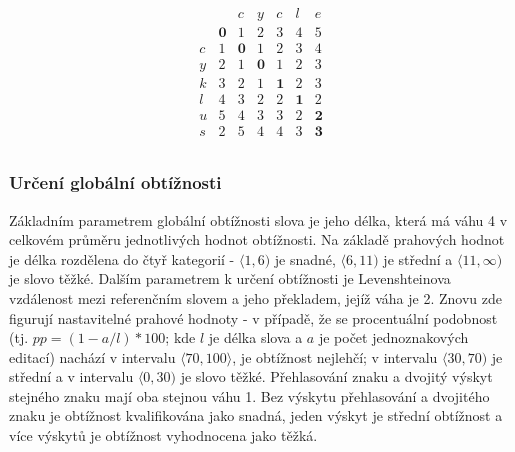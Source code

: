 \documentclass[a4paper,11pt,titlepage,fleqn]{article}
\begin{document}
            \begin{ceqn}
            \begin{align}
                \label{leven-matice}
                \begin{matrix}
                    &  & c & y & c & l & e \\
                    & \textbf{0} & 1 & 2  & 3 & 4  & 5 \\
                    c & 1 & \textbf{0} & 1 & 2 & 3 & 4 \\
                    y & 2 & 1 & \textbf{0} & 1 & 2 & 3 \\
                    k & 3 & 2 & 1 & \textbf{1} & 2 & 3 \\
                    l & 4 & 3 & 2 & 2 & \textbf{1} & 2 \\
                    u & 5 & 4 & 3 & 3 & 2 & \textbf{2} \\
                    s & 2 & 5 & 4 & 4 & 3 & \textbf{3} \\ 
                \end{matrix}
            \end{align}
            \end{ceqn}

        \subsubsection{Určení globální obtížnosti}
            Základním parametrem globální obtížnosti slova je jeho délka, která má váhu 4 v celkovém průměru jednotlivých hodnot obtížnosti. Na základě prahových hodnot je délka rozdělena do čtyř kategorií - $\langle1,6)$ je snadné, $\langle6,11)$ je střední a $\langle11,\infty)$ je slovo těžké. Dalším parametrem k určení obtížnosti je Levenshteinova vzdálenost mezi referenčním slovem a jeho překladem, jejíž váha je 2. Znovu zde figurují nastavitelné prahové hodnoty - v případě, že se procentuální podobnost (tj. $pp = (1-a/l)*100$; kde $l$ je délka slova a $a$ je počet jednoznakových editací) nachází v intervalu $\langle70,100\rangle$, je obtížnost nejlehčí; v intervalu $\langle30,70)$ je střední a v intervalu $\langle0,30)$ je slovo těžké. Přehlasování znaku a dvojitý výskyt stejného znaku mají oba stejnou váhu 1. Bez výskytu přehlasování a dvojitého znaku je obtížnost kvalifikována jako snadná, jeden výskyt je střední obtížnost a více výskytů je obtížnost vyhodnocena jako těžká.
\end{document}
